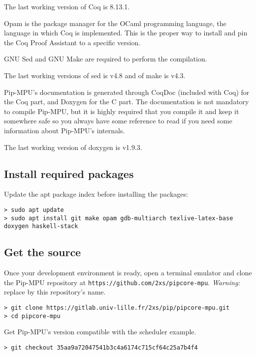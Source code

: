 \documentclass[10pt,a4paper,titlepage]{refart}
\begin{document}
The last working version of Coq is 8.13.1.

 
Opam is the package manager for the OCaml programming language, the language in
which Coq is implemented. This is the proper way to install and pin the Coq
Proof Assistant to a specific version.

GNU Sed and GNU Make are required to perform the compilation.

The last working versions of sed is v4.8 and of make is v4.3.

Pip-MPU's documentation is generated through CoqDoc (included with Coq) for the Coq part, and Doxygen for the C part.
The documentation is not mandatory to compile Pip-MPU, but it is highly required that you compile it and keep it somewhere safe so you always have some reference to read if you need some information about Pip-MPU's internals.

The last working version of doxygen is v1.9.3.

\subsection{Install required packages}

Update the apt package index before installing the packages:

\begin{lstlisting}[style=BashStyle]
> sudo apt update
> sudo apt install git make opam gdb-multiarch texlive-latex-base doxygen haskell-stack
\end{lstlisting}

\subsection{Get the source}
Once your development environment is ready, open a terminal emulator and clone the Pip-MPU repository at \texttt{https://github.com/2xs/pipcore-mpu}.
\textit{Warning:} replace by this repository's name.

\begin{lstlisting}[style=BashStyle]
> git clone https://gitlab.univ-lille.fr/2xs/pip/pipcore-mpu.git
> cd pipcore-mpu
\end{lstlisting}

Get Pip-MPU's version compatible with the scheduler example.

\begin{lstlisting}[style=BashStyle]
> git checkout 35aa9a72047541b3c4a6174c715cf64c25a7b4f4
\end{lstlisting}
\end{document}
